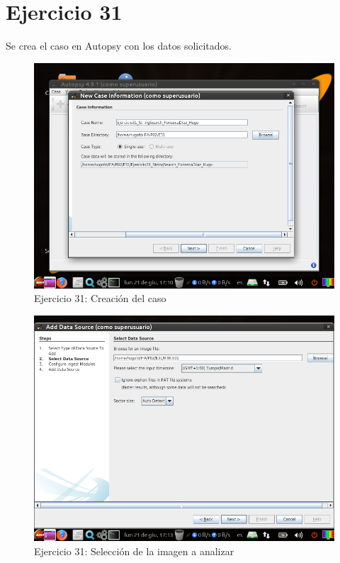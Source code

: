 \documentclass[11pt]{article}
\begin{document}
\section{Ejercicio 31}
Se crea el caso en Autopsy con los datos solicitados.

\begin{figure}[H]
    \caption{Ejercicio 31: Creación del caso}
  \centering
  \includegraphics[scale=0.7]{e31-1.png}
\end{figure}

\begin{figure}[H]
    \caption{Ejercicio 31: Selección de la imagen a analizar}
  \centering
  \includegraphics[scale=0.7]{e31-2.png}
\end{figure}
\end{document}
